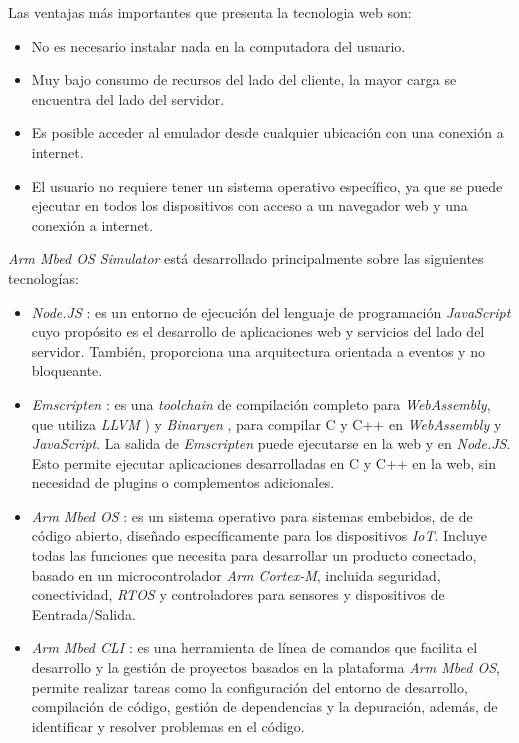 \hfill \break
\hfill \break
\hfill \break

Las ventajas más importantes que presenta la tecnologia web son:

\begin{itemize}
	\item No es necesario instalar nada en la computadora del usuario.
	\item Muy bajo consumo de recursos del lado del cliente, la mayor carga se encuentra del lado del servidor.
	\item Es posible acceder al emulador desde cualquier ubicación con una conexión a internet.
	\item El usuario no requiere tener un sistema operativo específico, ya que se puede ejecutar en todos los dispositivos con acceso a un navegador web y una conexión a internet.
\end{itemize}

\textit{Arm Mbed OS Simulator} está desarrollado principalmente sobre las siguientes tecnologías:

\begin{itemize}

    \item \textit{Node.JS} \citep{NodeJS}: es un entorno de ejecución del lenguaje de programación \textit{JavaScript} \citep{JavaScript} cuyo propósito es el desarrollo de aplicaciones web y servicios del lado del servidor. También, proporciona una arquitectura orientada a eventos y no bloqueante. 
 
    \item \textit{Emscripten} \citep{Emscripten}: es una \textit{toolchain} de compilación completo para \textit{WebAssembly}, que utiliza \textit{LLVM} \citep{LLVM}) y \textit{Binaryen} \citep{Binaryen}, para compilar C y C++ en \textit{WebAssembly} \citep{WebAssembly} y \textit{JavaScript}. La salida de \textit{Emscripten} puede ejecutarse en la web y en \textit{Node.JS}. Esto permite ejecutar aplicaciones desarrolladas en C y C++ en la web, sin necesidad de plugins o complementos adicionales.

    \item \textit{Arm Mbed OS} \citep{MbedOS}: es un sistema operativo para sistemas embebidos, de de código abierto, diseñado específicamente para los dispositivos \textit{IoT}. Incluye todas las funciones que necesita para desarrollar un producto conectado, basado en un microcontrolador \textit{Arm Cortex-M}, incluida seguridad, conectividad, \textit{RTOS} y controladores para sensores y dispositivos de Eentrada/Salida.
    
    \item \textit{Arm Mbed CLI} \citep{MbedCLI}: es una herramienta de línea de comandos que facilita el desarrollo y la gestión de proyectos basados en la plataforma \textit{Arm Mbed OS}, permite realizar tareas como la configuración del entorno de desarrollo, compilación de código, gestión de dependencias y la depuración, además, de identificar y resolver problemas en el código.

\end{itemize}

